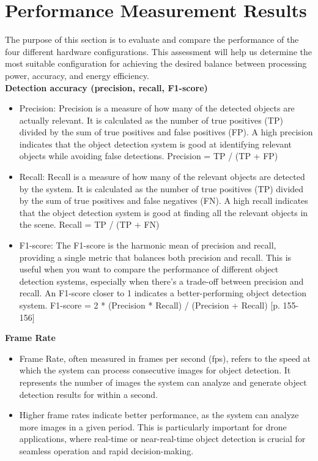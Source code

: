 \section*{Performance Measurement Results}

The purpose of this section is to evaluate and compare the performance of the four different hardware configurations. This assessment will help us determine the most suitable configuration for achieving the desired balance between processing power, accuracy, and energy efficiency.\\


\textbf{Detection accuracy (precision, recall, F1-score)}
\begin{itemize}

\item Precision: Precision is a measure of how many of the detected objects are actually relevant. It is calculated as the number of true positives (TP) divided by the sum of true positives and false positives (FP). A high precision indicates that the object detection system is good at identifying relevant objects while avoiding false detections. 
Precision = TP / (TP + FP)

\item Recall: Recall is a measure of how many of the relevant objects are detected by the system. It is calculated as the number of true positives (TP) divided by the sum of true positives and false negatives (FN). A high recall indicates that the object detection system is good at finding all the relevant objects in the scene.
Recall = TP / (TP + FN)

\item F1-score: The F1-score is the harmonic mean of precision and recall, providing a single metric that balances both precision and recall. This is useful when you want to compare the performance of different object detection systems, especially when there's a trade-off between precision and recall. An F1-score closer to 1 indicates a better-performing object detection system.
F1-score = 2 * (Precision * Recall) / (Precision + Recall) \cite{preandrec}[p. 155-156]\\ 
\end{itemize}
\newpage
\textbf{Frame Rate}
\begin{itemize}
\item Frame Rate, often measured in frames per second (fps), refers to the speed at which the system can process consecutive images for object detection. It represents the number of images the system can analyze and generate object detection results for within a second.
\item Higher frame rates indicate better performance, as the system can analyze more images in a given period. This is particularly important for drone applications, where real-time or near-real-time object detection is crucial for seamless operation and rapid decision-making.\\
\end{itemize}

